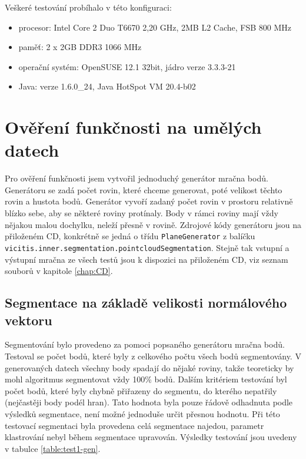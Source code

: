 \documentclass[11pt,twoside,a4paper]{book}
\begin{document}
\noindent
Veškeré testování probíhalo v této konfiguraci:
\begin{itemize}
 \item procesor: Intel Core 2 Duo T6670 2,20 GHz, 2MB L2 Cache, FSB 800 MHz
 \item paměť: 2 x 2GB DDR3 1066 MHz 
 \item operační systém: OpenSUSE 12.1 32bit, jádro verze 3.3.3-21
 \item Java: verze 1.6.0\_24, Java HotSpot VM 20.4-b02
\end{itemize}

\section{Ověření funkčnosti na umělých datech}

Pro ověření funkčnosti jsem vytvořil jednoduchý generátor mračna bodů. Generátoru se zadá počet rovin, které chceme generovat, poté velikost těchto rovin a hustota bodů. Generátor vyvoří zadaný počet rovin v prostoru relativně blízko sebe, aby se některé roviny protínaly. Body v rámci roviny mají vždy nějakou malou dochylku, neleží přesně v rovině. Zdrojové kódy generátoru jsou na přiloženém CD, konkrétně se jedná o třídu \verb|PlaneGenerator| z balíčku \verb|vicitis.inner.segmentation.pointcloudSegmentation|. Stejně tak vstupní a výstupní mračna ze všech testů jsou k dispozici na přiloženém CD, viz seznam souborů v kapitole \ref{chap:CD}. 

\subsection{Segmentace na základě velikosti normálového vektoru}

Segmentování bylo provedeno za pomoci popsaného generátoru mračna bodů. Testoval se počet bodů, které byly z celkového počtu všech bodů segmentovány. V generovaných datech všechny body spadají do nějaké roviny, takže teoreticky by mohl algoritmus segmentovat vždy 100\% bodů. Dalším kritériem testování byl počet bodů, které byly chybně přiřazeny do segmentu, do kterého nepatřily (nejčastěji body podél hran). Tato hodnota byla pouze řádově odhadnuta podle výsledků segmentace, není možné jednoduše určit přesnou hodnotu. Při této testovací segmentaci byla provedena celá segmentace najedou, parametr klastrování nebyl během segmentace upravován. Výsledky testování jsou uvedeny v tabulce \ref{table:test1-gen}.
\end{document}
